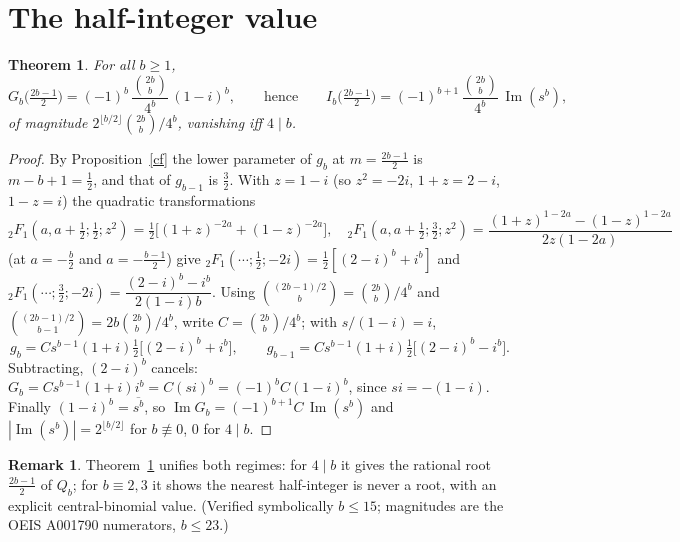 \documentclass[11pt]{article}
\newtheorem{theorem}{Theorem}
\theoremstyle{definition}
\newtheorem{remark}{Remark}
\DeclareMathOperator{\Imag}{Im}
\begin{document}
\section{The half-integer value}
\begin{theorem}\label{A}
For all $b\ge 1$,
\[
G_b\!\Big(\tfrac{2b-1}{2}\Big)=(-1)^b\,\frac{\binom{2b}{b}}{4^b}\,(1-i)^b ,
\qquad\text{hence}\qquad
I_b\!\Big(\tfrac{2b-1}{2}\Big)=(-1)^{b+1}\,\frac{\binom{2b}{b}}{4^b}\,\Imag(s^b),
\]
of magnitude $2^{\lfloor b/2\rfloor}\binom{2b}{b}/4^b$, vanishing iff $4\mid b$.
\end{theorem}
\begin{proof}
By Proposition~\ref{cf} the lower parameter of $g_b$ at $m=\tfrac{2b-1}2$ is
$m-b+1=\tfrac12$, and that of $g_{b-1}$ is $\tfrac32$. With $z=1-i$ (so $z^2=-2i$,
$1+z=2-i$, $1-z=i$) the quadratic transformations
\[
{}_2F_1(a,a+\tfrac12;\tfrac12;z^2)=\tfrac12\big[(1+z)^{-2a}+(1-z)^{-2a}\big],\quad
{}_2F_1(a,a+\tfrac12;\tfrac32;z^2)=\frac{(1+z)^{1-2a}-(1-z)^{1-2a}}{2z(1-2a)}
\]
(at $a=-\tfrac b2$ and $a=-\tfrac{b-1}2$) give
${}_2F_1(\cdots;\tfrac12;-2i)=\tfrac12[(2-i)^b+i^b]$ and
${}_2F_1(\cdots;\tfrac32;-2i)=\dfrac{(2-i)^b-i^b}{2(1-i)b}$.
Using $\binom{(2b-1)/2}{b}=\binom{2b}{b}/4^b$ and $\binom{(2b-1)/2}{b-1}=2b\binom{2b}{b}/4^b$,
write $C=\binom{2b}{b}/4^b$; with $s/(1-i)=i$,
\[
g_b=C s^{b-1}(1+i)\tfrac12\big[(2-i)^b+i^b\big],\qquad
g_{b-1}=C s^{b-1}(1+i)\tfrac12\big[(2-i)^b-i^b\big].
\]
Subtracting, $(2-i)^b$ cancels: $G_b=C s^{b-1}(1+i)i^b=C(si)^b=(-1)^bC(1-i)^b$, since
$si=-(1-i)$. Finally $(1-i)^b=\overline{s^b}$, so $\Imag G_b=(-1)^{b+1}C\,\Imag(s^b)$ and
$|\Imag(s^b)|=2^{\lfloor b/2\rfloor}$ for $b\not\equiv0$, $0$ for $4\mid b$.
\end{proof}
\begin{remark}
Theorem~\ref{A} unifies both regimes: for $4\mid b$ it gives the rational root $\tfrac{2b-1}2$ of
$Q_b$; for $b\equiv2,3$ it shows the nearest half-integer is never a root, with an explicit
central-binomial value. (Verified symbolically $b\le 15$; magnitudes are the OEIS A001790
numerators, $b\le 23$.)
\end{remark}
\end{document}
